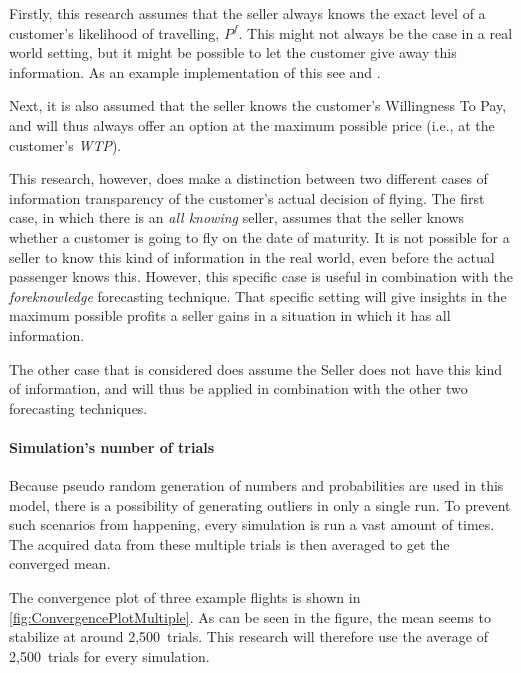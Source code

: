 Firstly, this research assumes that the seller always knows the exact level of a customer's likelihood of travelling, $P^f$. This might not always be the case in a real world setting, but it might be possible to let the customer give away this information. As an example implementation of this see  and .

Next, it is also assumed that the seller knows the customer's Willingness To Pay, and will thus always offer an option at the maximum possible price (i.e., at the customer's \emph{WTP}).

This research, however, does make a distinction between two different cases of information transparency of the customer's actual decision of flying. The first case, in which there is an \emph{all knowing} seller, assumes that the seller knows whether a customer is going to fly on the date of maturity. It is not possible for a seller to know this kind of information in the real world, even before the actual passenger knows this. However, this specific case is useful in combination with the \emph{foreknowledge} forecasting technique. That specific setting will give insights in the maximum possible profits a seller gains in a situation in which it has all information.

The other case that is considered does assume the Seller does not have this kind of information, and will thus be applied in combination with the other two forecasting techniques.

\paragraph{Simulation's number of trials}
Because pseudo random generation of numbers and probabilities are used in this model, there is a possibility of generating outliers in only a single run. To prevent such scenarios from happening, every simulation is run a vast amount of times. The acquired data from these multiple trials is then averaged to get the converged mean.

The convergence plot of three example flights is shown in \autoref{fig:ConvergencePlotMultiple}. As can be seen in the figure, the mean seems to stabilize at around 2,500~trials. This research will therefore use the average of 2,500~trials for every simulation.

